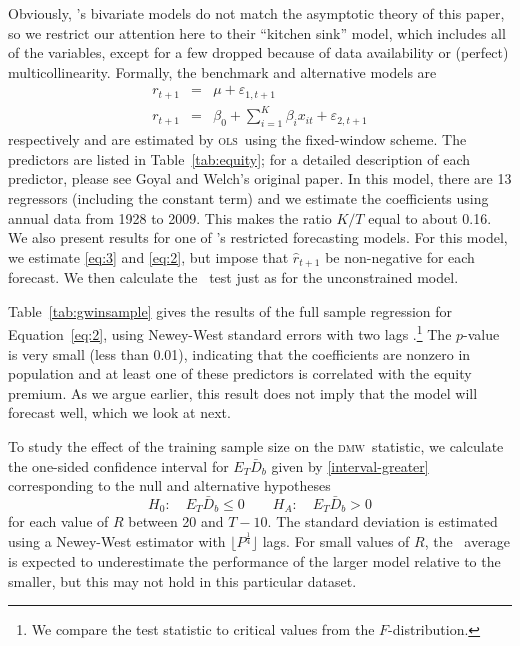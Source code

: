 \documentclass[11pt]{article}
\newcommand{\citepos}[1]{\citeauthor{#1}'s \citeyearpar{#1}}
\newcommand{\oosB}{\bar{D}_b}
\newcommand{\dmw}{\textsc{dmw}}
\newcommand{\ols}{\textsc{ols}}
\begin{document}
Obviously, \citepos{GoW:08} bivariate models do not
match the asymptotic theory of this paper, so we restrict our
attention here to their ``kitchen sink'' model, which includes all of
the variables, except for a few dropped because of data availability or
(perfect) multicollinearity.  Formally, the benchmark and alternative models are
\begin{eqnarray}
  \label{eq:3}
  r_{t+1} &=& \mu + \varepsilon_{1,t+1} \\
  \label{eq:2}
r_{t+1} &=& \beta_0 + \sum_{i=1}^K \beta_{i} x_{it} + \varepsilon_{2,t+1}  
\end{eqnarray}
respectively and are estimated by \ols\ using the fixed-window scheme.
The predictors are listed in Table~\ref{tab:equity}; for a detailed
description of each predictor, please see Goyal and Welch's original
paper.  In this model, there are 13 regressors (including the constant
term) and we estimate the coefficients using annual data from 1928 to
2009.  This makes the ratio $K/T$ equal to about 0.16.  We also
present results for one of \citepos{CaT:08}
restricted forecasting models.  For this model, we estimate
\eqref{eq:3} and \eqref{eq:2}, but impose that $\hat r_{t+1}$ be
non-negative for each forecast.  We then calculate the \oos\ test just
as for the unconstrained model.

Table~\ref{tab:gwinsample} gives the results of the full sample
regression for Equation~\eqref{eq:2}, using Newey-West standard errors
with two lags \citep{NeW:87}.\footnote{We compare the test statistic
  to critical values from the $F$-distribution.}  The $p$-value is
very small (less than 0.01), indicating that the coefficients are
nonzero in population and at least one of these predictors is
correlated with the equity premium.  As we argue earlier, this result
does not imply that the model will forecast well, which we look at
next.

To study the effect of the training sample size on the \dmw\ statistic, we
calculate the one-sided confidence interval for $E_T \oosB$ given
by \eqref{interval-greater} corresponding to the null and alternative
hypotheses
\[ H_0: \quad E_T \oosB \leq 0 \qquad
H_A: \quad E_T \oosB > 0
\]
for each value of $R$ between 20 and $T-10$.  The standard deviation
is estimated using a Newey-West estimator with $\lfloor
P^{\frac14}\rfloor$ lags.  For small values of $R$, the \oos\ average
is expected to underestimate the performance of the larger model
relative to the smaller, but this may not hold in this particular
dataset.
\end{document}
